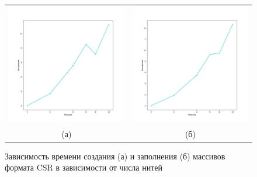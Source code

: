 \documentclass[12pt, a4paper]{article}
\begin{document}
\begin{figure}[H]
	\center
	\begin{tabular}{cc}
		\includegraphics[width=85mm]{csr_init_speedup} & \includegraphics[width=85mm]{csr_fill_speedup} \\
		(а) & (б) \\[6pt]
	\end{tabular}
	\caption{Зависимость времени создания (а) и заполнения (б) массивов формата CSR в зависимости от числа нитей} 
	\label{fig:gridd}
\end{figure}
\end{document}
